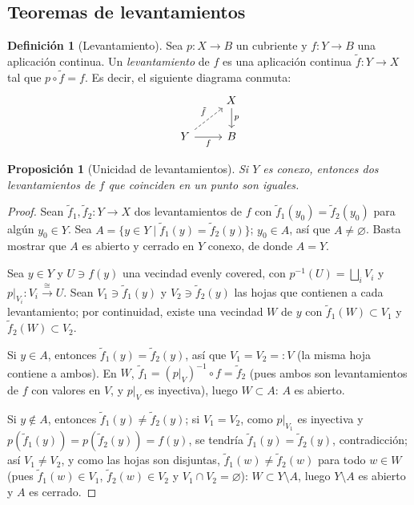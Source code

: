 \documentclass[11pt,a4paper]{article}
\theoremstyle{plain}
\newtheorem{proposition}[theorem]{Proposición}
\theoremstyle{definition}
\newtheorem{definition}[theorem]{Definición}
\theoremstyle{remark}
\begin{document}
\subsection{Teoremas de levantamientos}

\begin{definition}[Levantamiento]
\label{def:levantamiento}
Sea $p:X\to B$ un cubriente y $f:Y\to B$ una aplicación continua. Un
\emph{levantamiento} de $f$ es una aplicación continua $\tilde f:Y\to X$ tal
que $p\circ\tilde f=f$. Es decir, el siguiente diagrama conmuta:
\[
\begin{tikzcd}
& X \arrow[d,"p"] \\
Y \arrow[ur,dashed,"\tilde f"] \arrow[r,swap,"f"] & B
\end{tikzcd}
\]
\end{definition}

\begin{proposition}[Unicidad de levantamientos]
\label{prop:unicidad-levantamiento}
Si $Y$ es conexo, entonces dos levantamientos de $f$ que coinciden en un
punto son iguales.
\end{proposition}

\begin{proof}
Sean $\tilde f_1,\tilde f_2:Y\to X$ dos levantamientos de $f$ con
$\tilde f_1(y_0)=\tilde f_2(y_0)$ para algún $y_0\in Y$. Sea
$A=\{y\in Y\mid\tilde f_1(y)=\tilde f_2(y)\}$; $y_0\in A$, así que
$A\ne\varnothing$. Basta mostrar que $A$ es abierto y cerrado en $Y$
conexo, de donde $A=Y$.

Sea $y\in Y$ y $U\ni f(y)$ una vecindad evenly covered, con
$p^{-1}(U)=\bigsqcup_iV_i$ y $p|_{V_i}:V_i\xrightarrow{\cong}U$. Sean
$V_1\ni\tilde f_1(y)$ y $V_2\ni\tilde f_2(y)$ las hojas que contienen a
cada levantamiento; por continuidad, existe una vecindad $W$ de $y$ con
$\tilde f_1(W)\subset V_1$ y $\tilde f_2(W)\subset V_2$.

Si $y\in A$, entonces $\tilde f_1(y)=\tilde f_2(y)$, así que $V_1=V_2=:V$
(la misma hoja contiene a ambos). En $W$, $\tilde f_1=(p|_V)^{-1}\circ f=\tilde f_2$
(pues ambos son levantamientos de $f$ con valores en $V$, y $p|_V$ es
inyectiva), luego $W\subset A$: $A$ es abierto.

Si $y\notin A$, entonces $\tilde f_1(y)\ne\tilde f_2(y)$; si $V_1=V_2$,
como $p|_{V_1}$ es inyectiva y $p(\tilde f_1(y))=p(\tilde f_2(y))=f(y)$, se
tendría $\tilde f_1(y)=\tilde f_2(y)$, contradicción; así $V_1\ne V_2$, y
como las hojas son disjuntas, $\tilde f_1(w)\ne\tilde f_2(w)$ para todo
$w\in W$ (pues $\tilde f_1(w)\in V_1$, $\tilde f_2(w)\in V_2$ y
$V_1\cap V_2=\varnothing$): $W\subset Y\setminus A$, luego
$Y\setminus A$ es abierto y $A$ es cerrado.
\end{proof}
\end{document}
